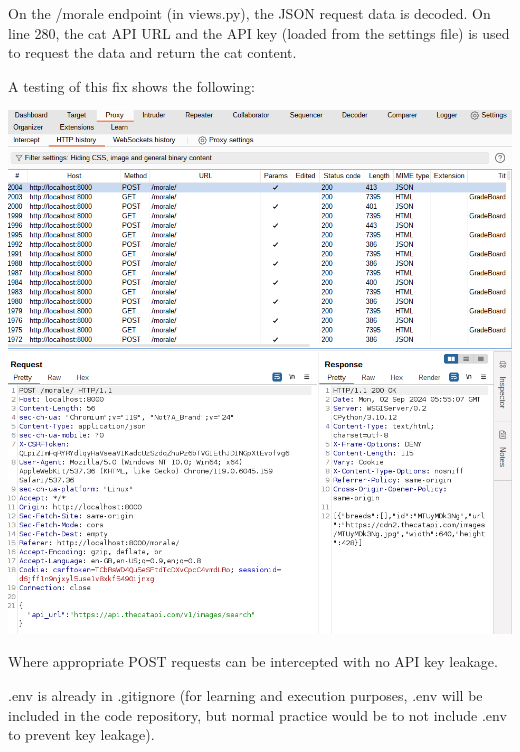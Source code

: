 On the /morale endpoint (in views.py), the JSON request data is decoded. On line 280, the cat API URL and the API key (loaded from the settings file) is used to request the data and return the cat content.

A testing of this fix shows the following:

\begin{center}
    \includegraphics[width = \linewidth]{images/Michelle/catapifix.png}
\end{center}

Where appropriate POST requests can be intercepted with no API key leakage.

.env is already in .gitignore (for learning and execution purposes, .env will be included in the code repository, but normal practice would be to not include .env to prevent key leakage).


